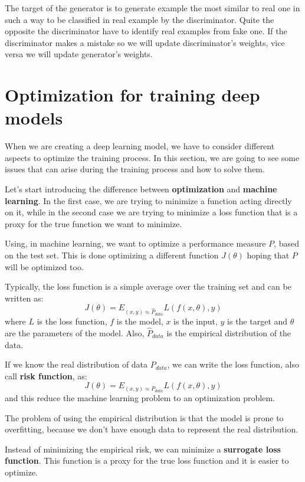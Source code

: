 The target of the generator is to generate example the most similar to real one
in such a way to be classified in real example by the discriminator. Quite the
opposite the discriminator have to identify real examples from fake one. If the
discriminator makes a mistake so we will update discriminator's weights, vice
versa we will update generator's weights.
\section{Optimization for training deep models}
When we are creating a deep learning model, we have to consider different aspects
to optimize the training process. In this section, we are going to see some
issues that can arise during the training process and how to solve them.

Let's start introducing the difference between \textbf{optimization} and
\textbf{machine learning}. In the first case, we are trying to minimize a function
acting directly on it, while in the second case we are trying to minimize a loss
function that is a proxy for the true function we want to minimize.

Using, in machine learning, we want to optimize a performance measure $P$, based
on the test set. This is done optimizing a different function $J(\theta)$ hoping
that $P$ will be optimized too.

Typically, the loss function is a simple average over the training set and can be
written as:
\begin{equation}
    J(\theta) = E_{(x, y) \approx \hat{P}_{data}} L(f(x, \theta), y)
\end{equation}
where $L$ is the loss function, $f$ is the model, $x$ is the input, $y$ is the
target and $\theta$ are the parameters of the model. Also, $\hat{P}_{data}$ is
the empirical distribution of the data.

If we know the real distribution of data $P_{data}$, we can write the loss
function, also call \textbf{risk function}, as:
\begin{equation}
    J(\theta) = E_{(x, y) \approx P_{data}} L(f(x, \theta), y)
\end{equation}
and this reduce the machine learning problem to an optimization problem.

The problem of using the empirical distribution is that the model is prone to
overfitting, because we don't have enough data to represent the real distribution.

Instead of minimizing the empirical risk, we can minimize a \textbf{surrogate
    loss function}. This function is a proxy for the true loss function and it
is easier to optimize.

